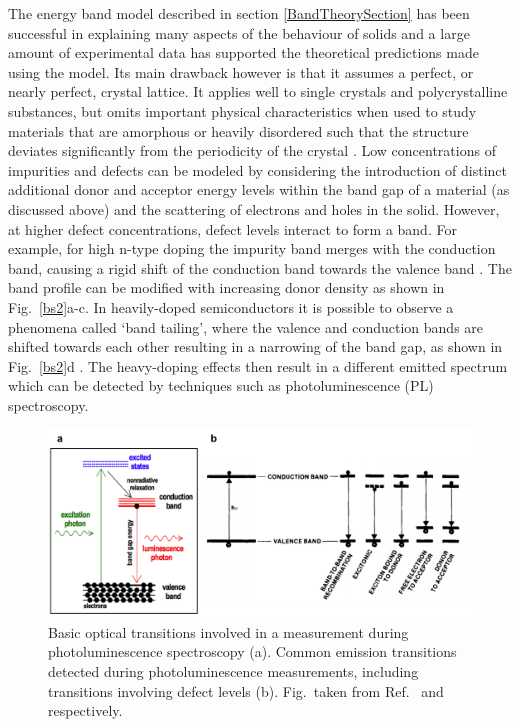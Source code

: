 \documentclass[11pt, twoside]{report}
\begin{document}
The energy band model described in section \ref{BandTheorySection} has been successful in explaining many aspects of the behaviour of solids and a large amount of experimental data has supported the theoretical predictions made using the model. Its main drawback however is that it assumes a perfect, or nearly perfect, crystal lattice. It applies well to single crystals and polycrystalline substances, but omits important physical characteristics when used to study materials that are amorphous or heavily disordered such that the structure deviates significantly from the periodicity of the crystal \cite{small_semiconductor1}.
Low concentrations of impurities and defects can be modeled by considering the introduction of distinct additional donor and acceptor energy levels within the band gap of a material (as discussed above) and the scattering of electrons and holes in the solid. 
However, at higher defect concentrations, defect levels interact to form a band. For example, for high n-type doping the impurity band merges with the conduction band, causing a rigid shift of the conduction band towards the valence band \cite{Pankove}. The band profile can be modified with increasing donor density as shown in Fig.~\ref{bs2}a-c. 
In heavily-doped semiconductors it is possible to observe a phenomena called `band tailing', where the valence and conduction bands are shifted towards each other resulting in a narrowing of the band gap, as shown in Fig.~\ref{bs2}d \cite{Pankove}. The heavy-doping effects then result in a different emitted spectrum which can be detected by techniques such as photoluminescence (PL) spectroscopy. 

\begin{figure}[h!]
  \centering
    \includegraphics[width=1.0\textwidth]{figures/PL_transitions.png}
    \caption[Basic optical transitions involved in a measurement during photoluminescence spectroscopy (a). Common emission transitions detected during photoluminescence measurements, including transitions involving defect levels (b).]{Basic optical transitions involved in a measurement during photoluminescence spectroscopy (a). Common emission transitions detected during photoluminescence measurements, including transitions involving defect levels (b). Fig.~taken from Ref.~ and  respectively.}
  \label{PL_transitions}
\end{figure}
\end{document}
